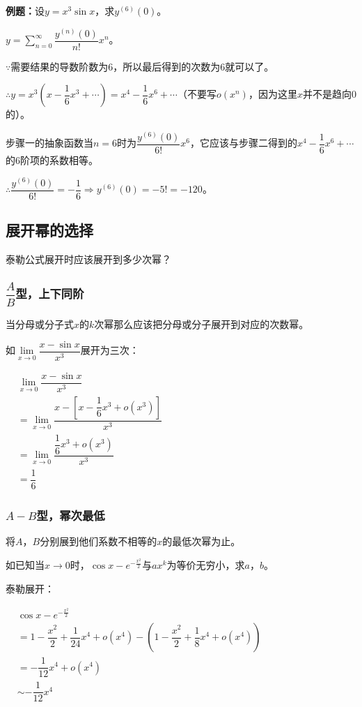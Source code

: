 \documentclass[UTF8, 12pt]{ctexart}
\begin{document}
\textbf{例题：}设$y=x^3\sin x$，求$y^{(6)}(0)$。

$y=\sum_{n=0}^\infty\dfrac{y^{(n)}(0)}{n!}x^n$。

$\because$需要结果的导数阶数为6，所以最后得到的次数为6就可以了。

$\therefore y=x^3\left(x-\dfrac{1}{6}x^3+\cdots\right)=x^4-\dfrac{1}{6}x^6+\cdots$（不要写$o(x^n)$，因为这里$x$并不是趋向0的）。

步骤一的抽象函数当$n=6$时为$\dfrac{y^{(6)}(0)}{6!}x^6$，它应该与步骤二得到的$x^4-\dfrac{1}{6}x^6+\cdots$的6阶项的系数相等。

$\therefore \dfrac{y^{(6)}(0)}{6!}=-\dfrac{1}{6}\Rightarrow y^{(6)}(0)=-5!=-120$。

\subsection{展开幂的选择}

泰勒公式展开时应该展开到多少次幂？

\subsubsection{\texorpdfstring{$\dfrac{A}{B}$}\ 型，上下同阶}

当分母或分子式$x$的$k$次幂那么应该把分母或分子展开到对应的次数幂。

如$\lim\limits_{x\to 0}\dfrac{x-\sin x}{x^3}$展开为三次：

$
\begin{aligned}
    & \lim\limits_{x\to 0}\dfrac{x-\sin x}{x^3} \\
    & =\lim\limits_{x\to 0}\dfrac{x-\left[x-\dfrac{1}{6}x^3+o(x^3)\right]}{x^3} \\
    & =\lim\limits_{x\to 0}\dfrac{\dfrac{1}{6}x^3+o(x^3)}{x^3} \\
    & =\dfrac{1}{6}
\end{aligned}
$

\subsubsection{\texorpdfstring{$A-B$}\ 型，幂次最低}

将$A$，$B$分别展到他们系数不相等的$x$的最低次幂为止。

如已知当$x\to 0$时，$\cos x-e^{-\frac{x^2}{2}}$与$ax^k$为等价无穷小，求$a$，$b$。

泰勒展开：

$
\begin{aligned}
    & \cos x-e^{-\frac{x^2}{2}} \\
    & = 1-\dfrac{x^2}{2}+\dfrac{1}{24}x^4+o(x^4)-\left(1-\dfrac{x^2}{2}+\dfrac{1}{8}x^4+o(x^4)\right) \\
    & = -\dfrac{1}{12}x^4+o(x^4) \\
    & \sim -\dfrac{1}{12}x^4
\end{aligned}
$
\end{document}
